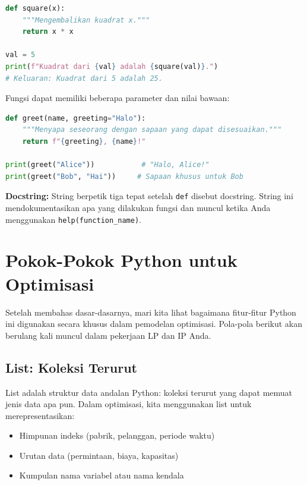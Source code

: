\begin{lstlisting}[language=Python]
def square(x):
    """Mengembalikan kuadrat x."""
    return x * x

val = 5
print(f"Kuadrat dari {val} adalah {square(val)}.")
# Keluaran: Kuadrat dari 5 adalah 25.
\end{lstlisting}

Fungsi dapat memiliki beberapa parameter dan nilai bawaan:

\begin{lstlisting}[language=Python]
def greet(name, greeting="Halo"):
    """Menyapa seseorang dengan sapaan yang dapat disesuaikan."""
    return f"{greeting}, {name}!"

print(greet("Alice"))           # "Halo, Alice!"
print(greet("Bob", "Hai"))     # Sapaan khusus untuk Bob
\end{lstlisting}

\begin{info}
\textbf{Docstring:} String berpetik tiga tepat setelah \texttt{def} disebut docstring. String ini mendokumentasikan apa yang dilakukan fungsi dan muncul ketika Anda menggunakan \texttt{help(function\_name)}.
\end{info}

\section{Pokok-Pokok Python untuk Optimisasi}

Setelah membahas dasar-dasarnya, mari kita lihat bagaimana fitur-fitur Python ini digunakan secara khusus dalam pemodelan optimisasi. Pola-pola berikut akan berulang kali muncul dalam pekerjaan LP dan IP Anda.

\subsection{List: Koleksi Terurut}

List adalah struktur data andalan Python: koleksi terurut yang dapat memuat jenis data apa pun. Dalam optimisasi, kita menggunakan list untuk merepresentasikan:
\begin{itemize}
\item Himpunan indeks (pabrik, pelanggan, periode waktu)
\item Urutan data (permintaan, biaya, kapasitas)
\item Kumpulan nama variabel atau nama kendala
\end{itemize}

